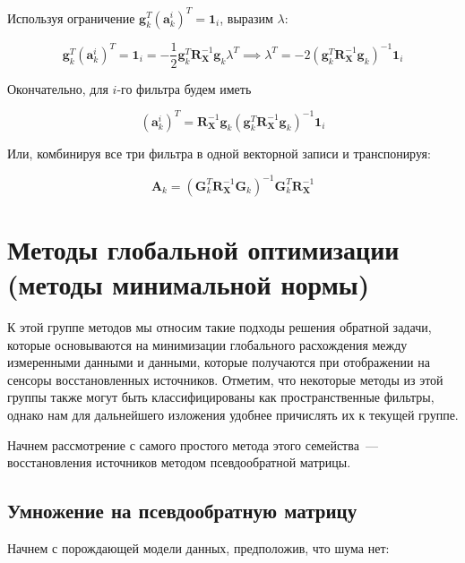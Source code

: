 Используя ограничение $\mathbf{g}_k^T (\mathbf{a}_k^i)^T = \mathbf{1}_i$, выразим $\lambda$:

\begin{equation}
    \mathbf{g}_k^T (\mathbf{a}_k^i)^T = \mathbf{1}_i =
    - \frac{1}{2}\mathbf{g}_k^T\mathbf{R}_\mathbf{X}^{-1} \mathbf{g}_k \lambda^T \implies
    \lambda^T = - 2{(\mathbf{g}_k^T\mathbf{R}_\mathbf{X}^{-1} \mathbf{g}_k)}^{-1} \mathbf{1}_i
\end{equation}

Окончательно, для $i$-го фильтра будем иметь

\begin{equation}
    (\mathbf{a}_k^i)^T = \mathbf{R}_\mathbf{X}^{-1} \mathbf{g}_k{(\mathbf{g}_k^T\mathbf{R}_\mathbf{X}^{-1} \mathbf{g}_k)}^{-1} \mathbf{1}_i
    \label{lcmv_filters_vec_comp}
\end{equation}

Или, комбинируя все три фильтра в одной векторной записи и транспонируя:

\begin{equation}
    \mathbf{A}_k =
    {(\mathbf{G}_k^T\mathbf{R}_\mathbf{X}^{-1} \mathbf{G}_k)}^{-1} \mathbf{G}_k^T \mathbf{R}_\mathbf{X}^{-1}
    \label{lcmv_filters_vec}
\end{equation}


\section{Методы глобальной оптимизации (методы минимальной нормы)}

К этой группе методов мы относим такие подходы решения обратной задачи,
которые основываются на минимизации глобального расхождения между измеренными данными
и данными, которые получаются при отображении на сенсоры восстановленных источников.
Отметим, что некоторые методы из этой группы также могут быть классифицированы как
пространственные фильтры, однако нам для дальнейшего изложения удобнее причислять их к
текущей группе.

Начнем рассмотрение с самого простого метода этого семейства~--- восстановления источников методом
псевдообратной матрицы.

\subsection{Умножение на псевдообратную матрицу}

Начнем с порождающей модели данных, предположив, что шума нет: 

